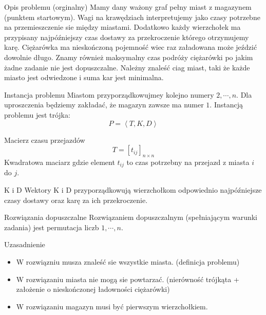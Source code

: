 \begin{frame}
	\begin{block}{Opis problemu (orginalny)}
		Mamy dany ważony graf pełny miast z magazynem (punktem startowym). Wagi na krawędziach interpretujemy jako czasy potrzebne na przemieszczenie sie między miastami. Dodatkowo każdy wierzchołek ma przypisany najpóźniejszy czas dostawy za przekroczenie którego otrzymujemy karę. 
		Ciężarówka ma nieskończoną pojemność wiec raz załadowana może jeździć dowolnie długo.
		Znamy również maksymalny czas podróży ciężarówki po jakim żadne zadanie nie jest dopuszczalne.
		Należny znaleść ciag miast, taki że każde miasto jest odwiedzone i suma kar jest minimalna.
	\end{block}
\end{frame}

\begin{frame}
	\begin{block}{Instancja problemu}
		Miastom przyporządkowujmey kolejno numery $2, \cdots, n$.
		Dla uproszczenia będziemy zakładać, że magazyn zawsze ma numer $1$.
		Instancją problemu jest trójka:
		\begin{equation}
			P = \left< T, K, D\right>
		\end{equation}
	\end{block}
	\begin{block}{Macierz czasu przejazdów}		
		\begin{equation}
			T = \left[ t_{ij} \right]_{n \times n} 
		\end{equation}
		Kwadratowa maciarz gdzie element $t_{ij}$ to czas potrzebny na przejazd z miasta $i$ do $j$.
	\end{block}
	\begin{block}{K i D}
		Wektory K i D przyporządkowują wierzchołkom odpowiednio najpóźniejsze czasy dostawy oraz karę za ich przekroczenie.
	\end{block}
\end{frame}

\begin{frame}
	\begin{block}{Rozwiązania dopuszczalne}
		Rozwiązaniem dopuszczalnym (spełniającym warunki zadania) jest permutacja liczb $1, \cdots, n$.
	\end{block}

	\begin{block}{Uzasadnienie}
		\begin{itemize}
			\item W rozwiązniu musza znaleść sie wszystkie miasta. (definicja problemu)
			\item W rozwiązaniu miasta nie mogą sie powtarzać. (nierówność trójkąta
				+ założenie o nieskończonej ładowności ciężarówki)
			\item W rozwiązaniu magazyn musi być pierwszym wierzchołkiem.
		\end{itemize}
	\end{block}
\end{frame}

